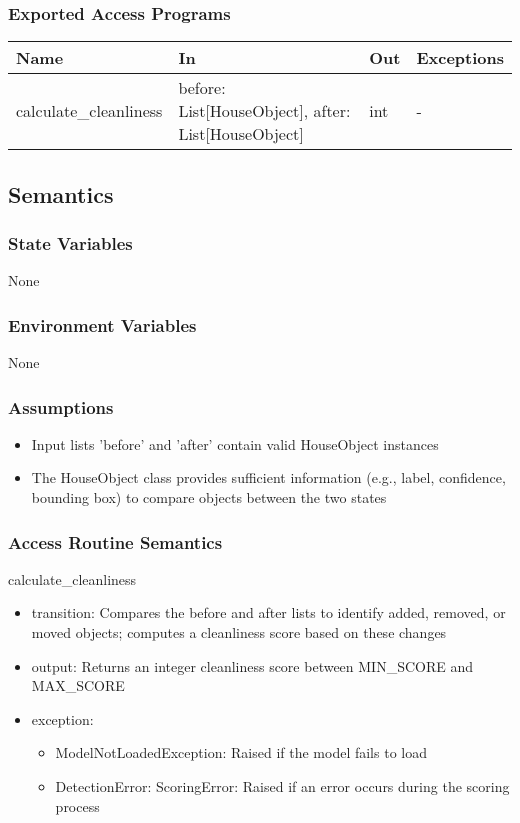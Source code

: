 \documentclass[12pt, titlepage]{article}
\begin{document}
\subsubsection{Exported Access Programs}

\begin{center}
\begin{tabular}{p{5cm} p{3cm} p{3cm} p{2cm}}
\hline
\textbf{Name} & \textbf{In} & \textbf{Out} & \textbf{Exceptions} \\
\hline
calculate{\_}cleanliness & before: List[HouseObject], after: List[HouseObject] & int & - \\
\hline
\end{tabular}
\end{center}

\subsection{Semantics}

\subsubsection{State Variables}
None


\subsubsection{Environment Variables}
None

\subsubsection{Assumptions}
\begin{itemize}
  \item Input lists 'before' and 'after' contain valid HouseObject instances
  \item The HouseObject class provides sufficient information (e.g., label, confidence, bounding box) to compare objects between the two states
\end{itemize}


\subsubsection{Access Routine Semantics}

\noindent calculate{\_}cleanliness
\begin{itemize}
\item transition: Compares the before and after lists to identify added, removed, or moved objects; computes a cleanliness score based on these changes
\item output: Returns an integer cleanliness score between MIN{\_}SCORE and MAX{\_}SCORE
\item exception: 
\begin{itemize}
  \item ModelNotLoadedException: Raised if the model fails to load
  \item DetectionError: ScoringError: Raised if an error occurs during the scoring process
\end{itemize}

\end{itemize}
\end{document}

